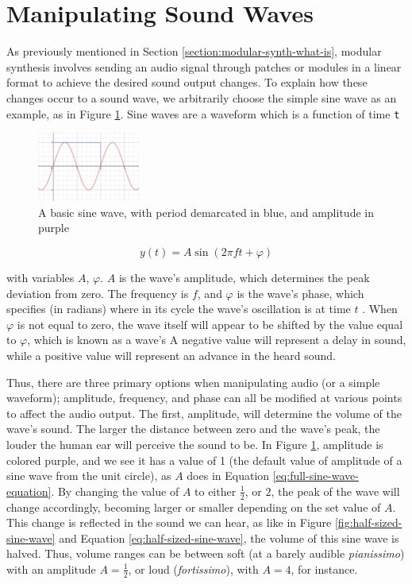 \section{Manipulating Sound Waves}\label{section:manip-waves}
As previously mentioned in Section \ref{section:modular-synth-what-is}, modular synthesis involves sending an audio signal through patches or modules in a linear format to achieve the desired sound output changes. To explain how these changes occur to a sound wave, we arbitrarily choose the simple sine wave as an example, as in Figure \ref{fig:sine-wave-period-amplitude}. Sine waves are a waveform which is a function of time \texttt{t}

\begin{figure}[ht]
	\centering
	\includegraphics[width=0.3\textwidth]{figures/sine-wave-period-amplitude.png}
	\caption{A basic sine wave, with period demarcated in blue, and amplitude in purple}
	\label{fig:sine-wave-period-amplitude}
\end{figure}

\begin{equation}\label{eq:full-sine-wave-equation}
	y(t) = A \sin(2\pi ft + \varphi)
\end{equation}

with variables $A$, $\varphi$. $A$ is the wave's amplitude, which determines the peak deviation from zero. The frequency is $f$, and $\varphi$ is the wave's phase, which specifies (in radians) where in its cycle the wave's oscillation is at time $t$ \cite{Kirk_Hunt_2013}. When $\varphi$ is not equal to zero, the wave itself will appear to be shifted by the value equal to $\varphi$, which is known as a wave's  A negative value will represent a delay in sound, while a positive value will represent an advance in the heard sound.

Thus, there are three primary options when manipulating audio (or a simple waveform); amplitude, frequency, and phase can all be modified at various points to affect the audio output. The first, amplitude, will determine the volume of the wave's sound. The larger the distance between zero and the wave's peak, the louder the human ear will perceive the sound to be\cite{Zjalic_2021}. In Figure \ref{fig:sine-wave-period-amplitude}, amplitude is colored purple, and we see it has a value of 1 (the default value of amplitude of a sine wave from the unit circle), as $A$ does in Equation \ref{eq:full-sine-wave-equation}. By changing the value of $A$ to either $\frac{1}{2}$, or $2$, the peak of the wave will change accordingly, becoming larger or smaller depending on the set value of $A$. This change is reflected in the sound we can hear, as like in Figure \ref{fig:half-sized-sine-wave} and Equation \ref{eq:half-sized-sine-wave}, the volume of this sine wave is halved. Thus, volume ranges can be between soft (at a barely audible \textit{pianissimo}) with an amplitude $A = \frac{1}{2}$, or loud (\textit{fortissimo}), with $A = 4$, for instance.

